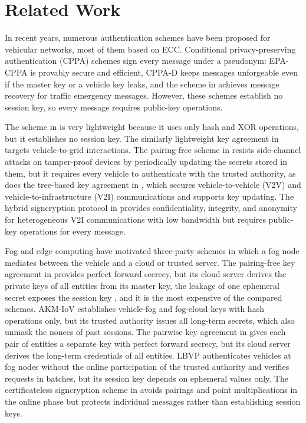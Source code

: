 \documentclass[journal]{IEEEtran}
\theoremstyle{plain}
\theoremstyle{definition}
\begin{document}
\section{Related Work}\label{sec:related}
In recent years, numerous authentication schemes have been proposed for vehicular networks, most of them based on ECC. Conditional privacy-preserving authentication (CPPA) schemes sign every message under a pseudonym: EPA-CPPA \cite{li2018epa} is provably secure and efficient, CPPA-D \cite{xiong2021cppa} keeps messages unforgeable even if the master key or a vehicle key leaks, and the scheme in \cite{wei2020secure} achieves message recovery for traffic emergency messages. However, these schemes establish no session key, so every message requires public-key operations.

The scheme in \cite{yu2018secure} is very lightweight because it uses only hash and XOR operations, but it establishes no session key. The similarly lightweight key agreement in \cite{ahmed2020anonymous} targets vehicle-to-grid interactions. The pairing-free scheme in \cite{cui2020secure} resists side-channel attacks on tamper-proof devices by periodically updating the secrets stored in them, but it requires every vehicle to authenticate with the trusted authority, as does the tree-based key agreement in \cite{wei2021proven}, which secures vehicle-to-vehicle (V2V) and vehicle-to-infrastructure (V2I) communications and supports key updating. The hybrid signcryption protocol in \cite{ali2021ecchsc} provides confidentiality, integrity, and anonymity for heterogeneous V2I communications with low bandwidth but requires public-key operations for every message.

Fog and edge computing have motivated three-party schemes in which a fog node mediates between the vehicle and a cloud or trusted server. The pairing-free key agreement in \cite{ma2019efficient} provides perfect forward secrecy, but its cloud server derives the private keys of all entities from its master key, the leakage of one ephemeral secret exposes the session key \cite{eftekhari2021security}, and it is the most expensive of the compared schemes. AKM-IoV \cite{wazid2019akm} establishes vehicle-fog and fog-cloud keys with hash operations only, but its trusted authority issues all long-term secrets, which also unmask the nonces of past sessions. The pairwise key agreement in \cite{eftekhari2021security} gives each pair of entities a separate key with perfect forward secrecy, but its cloud server derives the long-term credentials of all entities. LBVP \cite{zhang2022lbvp} authenticates vehicles at fog nodes without the online participation of the trusted authority and verifies requests in batches, but its session key depends on ephemeral values only. The certificateless signcryption scheme in \cite{xie2022efficient} avoids pairings and point multiplications in the online phase but protects individual messages rather than establishing session keys.
\end{document}
